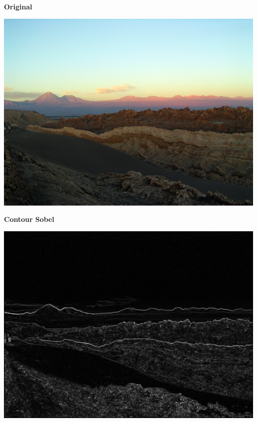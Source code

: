 \documentclass[a4paper, french, 12pt]{article}  %
\begin{document}
\begin{minipage}{0.45\linewidth}
\begin{center}
\textbf{Original}
 
\includegraphics[scale=0.3]{images/valleluna.jpg}
\end{center}
\end{minipage}\hfill
\begin{minipage}{0.45\linewidth}
\begin{center}
\textbf{Contour Sobel}

\includegraphics[scale=0.3]{images/valleluna-contour-sobel.png}
\end{center}
\end{minipage}
\end{document}

